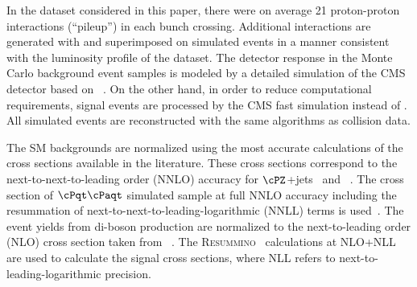 In the dataset considered in this paper,
there were on average 21 proton-proton interactions (``pileup'') in each bunch crossing.
Additional interactions are generated with \PYTHIA and superimposed on simulated events in a manner consistent with the
luminosity profile of the dataset.
The detector response in the Monte Carlo background event samples is modeled by a
detailed simulation
of the CMS detector based on {\GEANTfour}~\cite{Agostinelli:2002hh}.  
On the other hand, in order to reduce  computational requirements, signal events 
are processed by the CMS fast simulation \cite{Abdullin:2011zz} instead of {\GEANTfour}. 
All simulated events are reconstructed with the same algorithms as collision data.

The SM backgrounds are normalized using the most accurate calculations of the cross sections available 
in the literature. These cross sections correspond to the next-to-next-to-leading order (NNLO) accuracy for $\cPZ$+jets~\cite{Melnikov:2006kv} 
and \wjets~\cite{xsec_WZ}. The cross section of $\cPqt\cPaqt$ simulated sample at full NNLO accuracy including the resummation of 
next-to-next-to-leading-logarithmic (NNLL) terms is used~\cite{Czakon:2011xx}. 
The event yields from di-boson production are normalized to the next-to-leading order (NLO) cross section  taken from 
~\cite{Campbell:2011bn}. 
The \textsc{Resummino}~\cite{Fuks:2012qx,Fuks:2013vua,Fuks:2013lya} calculations at NLO+NLL are used to calculate the signal cross sections, where 
NLL refers to next-to-leading-logarithmic precision.


